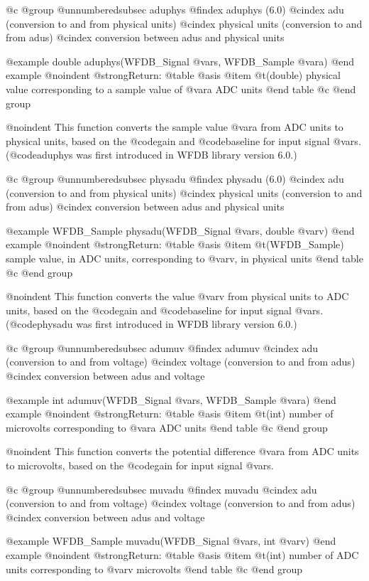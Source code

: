 {{{{{{{{@c @group
@unnumberedsubsec aduphys
@findex aduphys (6.0)
@cindex adu (conversion to and from physical units)
@cindex physical units (conversion to and from adus)
@cindex conversion between adus and physical units

@example
double aduphys(WFDB_Signal @var{s}, WFDB_Sample @var{a})
@end example
@noindent
@strong{Return:}
@table @asis
@item @t{(double)}
physical value corresponding to a sample value of @var{a} ADC units
@end table
@c @end group

@noindent
This function converts the sample value @var{a} from ADC units to
physical units, based on the @code{gain} and @code{baseline} for input
signal @var{s}.  (@code{aduphys} was first introduced in WFDB library
version 6.0.)

@c @group
@unnumberedsubsec physadu
@findex physadu (6.0)
@cindex adu (conversion to and from physical units)
@cindex physical units (conversion to and from adus)
@cindex conversion between adus and physical units

@example
WFDB_Sample physadu(WFDB_Signal @var{s}, double @var{v})
@end example
@noindent
@strong{Return:}
@table @asis
@item @t{(WFDB_Sample)}
sample value, in ADC units, corresponding to @var{v}, in physical units
@end table
@c @end group

@noindent
This function converts the value @var{v} from physical units to ADC
units, based on the @code{gain} and @code{baseline} for input signal
@var{s}.  (@code{physadu} was first introduced in WFDB library version
6.0.)

@c @group
@unnumberedsubsec adumuv
@findex adumuv
@cindex adu (conversion to and from voltage)
@cindex voltage (conversion to and from adus)
@cindex conversion between adus and voltage

@example
int adumuv(WFDB_Signal @var{s}, WFDB_Sample @var{a})
@end example
@noindent
@strong{Return:}
@table @asis
@item @t{(int)}
number of microvolts corresponding to @var{a} ADC units
@end table
@c @end group

@noindent
This function converts the potential difference @var{a} from ADC units to
microvolts, based on the @code{gain} for input signal @var{s}.

@c @group
@unnumberedsubsec muvadu
@findex muvadu
@cindex adu (conversion to and from voltage)
@cindex voltage (conversion to and from adus)
@cindex conversion between adus and voltage

@example
WFDB_Sample muvadu(WFDB_Signal @var{s}, int @var{v})
@end example
@noindent
@strong{Return:}
@table @asis
@item @t{(int)}
number of ADC units corresponding to @var{v} microvolts
@end table
@c @end group

}}}}}}}}
